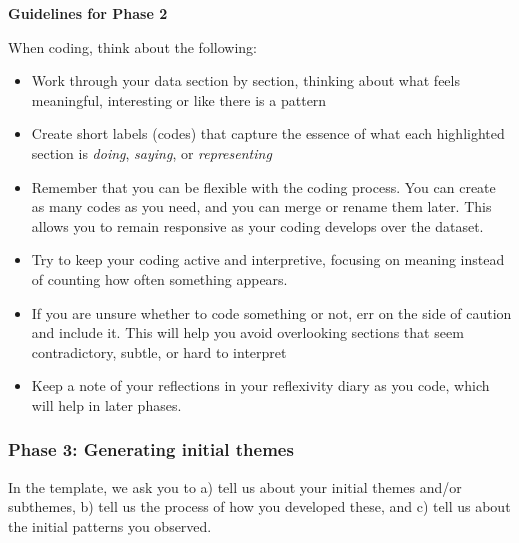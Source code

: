 \documentclass[
  english,
  letterpaper,
  DIV=11,
  numbers=noendperiod]{scrreprt}
\providecommand{\tightlist}{%
  \setlength{\itemsep}{0pt}\setlength{\parskip}{0pt}}
\begin{document}
\textbf{Guidelines for Phase 2}

When coding, think about the following:

\begin{itemize}
\tightlist
\item
  Work through your data section by section, thinking about what feels
  meaningful, interesting or like there is a pattern
\item
  Create short labels (codes) that capture the essence of what each
  highlighted section is \emph{doing}, \emph{saying}, or
  \emph{representing}
\item
  Remember that you can be flexible with the coding process. You can
  create as many codes as you need, and you can merge or rename them
  later. This allows you to remain responsive as your coding develops
  over the dataset.
\item
  Try to keep your coding active and interpretive, focusing on meaning
  instead of counting how often something appears.
\item
  If you are unsure whether to code something or not, err on the side of
  caution and include it. This will help you avoid overlooking sections
  that seem contradictory, subtle, or hard to interpret
\item
  Keep a note of your reflections in your reflexivity diary as you code,
  which will help in later phases.
\end{itemize}

\subsubsection{Phase 3: Generating initial
themes}\label{phase-3-generating-initial-themes}

\begin{tcolorbox}[enhanced jigsaw, breakable, bottomtitle=1mm, leftrule=.75mm, opacityback=0, colbacktitle=quarto-callout-important-color!10!white, opacitybacktitle=0.6, toprule=.15mm, colback=white, left=2mm, coltitle=black, bottomrule=.15mm, titlerule=0mm, title=\textcolor{quarto-callout-important-color}{\faExclamation}\hspace{0.5em}{Phase 3: What is asked for?}, toptitle=1mm, colframe=quarto-callout-important-color-frame, arc=.35mm, rightrule=.15mm]

In the template, we ask you to a) tell us about your initial themes
and/or subthemes, b) tell us the process of how you developed these, and
c) tell us about the initial patterns you observed.

\end{tcolorbox}
\end{document}
